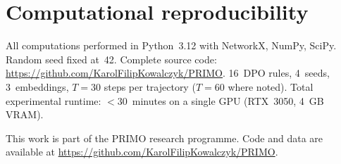 \documentclass{../shared/primo}
\begin{document}
\section{Computational reproducibility}
\label{app:reproducibility}

All computations performed in Python~3.12 with NetworkX, NumPy, SciPy. Random seed fixed at~42. Complete source code: \url{https://github.com/KarolFilipKowalczyk/PRIMO}. 16~DPO rules, 4~seeds, 3~embeddings, $T = 30$ steps per trajectory ($T = 60$ where noted). Total experimental runtime: $< 30$~minutes on a single GPU (RTX~3050, 4~GB VRAM).


\begin{acknowledgments}
This work is part of the PRIMO research programme. Code and data are available at \url{https://github.com/KarolFilipKowalczyk/PRIMO}.
\end{acknowledgments}



\end{document}
